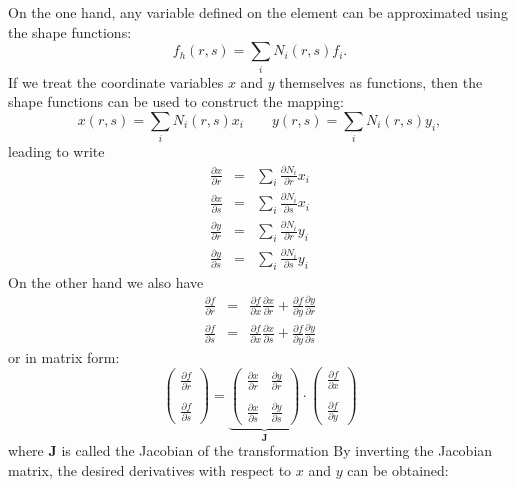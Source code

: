 On the one hand, any variable defined on the element can be approximated using the shape functions:
\begin{equation}
f_h(r,s)=\sum_i N_i(r,s) f_i.
\end{equation}
If we treat the coordinate variables $x$ and $y$ themselves as functions, 
then the shape functions can be used to construct the mapping:
\begin{equation}
x(r,s)=\sum_i N_i(r,s) x_i 
\qquad
y(r,s)=\sum_i N_i(r,s) y_i,  \label{eqxy}
\end{equation}
leading to write
\begin{eqnarray}
\frac{\partial x}{\partial r} &=& \sum_i \frac{\partial N_i}{\partial r} x_i \\
\frac{\partial x}{\partial s} &=& \sum_i \frac{\partial N_i}{\partial s} x_i \\
\frac{\partial y}{\partial r} &=& \sum_i \frac{\partial N_i}{\partial r} y_i \\
\frac{\partial y}{\partial s} &=& \sum_i \frac{\partial N_i}{\partial s} y_i 
\end{eqnarray}
On the other hand we also have 
\begin{eqnarray}
\frac{\partial f}{\partial r} &=&
\frac{\partial f}{\partial x}\frac{\partial x}{\partial r}
+\frac{\partial f}{\partial y}\frac{\partial y}{\partial r} \\
\frac{\partial f}{\partial s} &=&
\frac{\partial f}{\partial x}\frac{\partial x}{\partial s}
+\frac{\partial f}{\partial y}\frac{\partial y}{\partial s}
\end{eqnarray}
or in matrix form:
\begin{equation}
\left(
\begin{array}{c}
\frac{\partial f}{\partial r} \\ \\
\frac{\partial f}{\partial s}
\end{array}
\right)
=
\underbrace{
\left(
\begin{array}{cc}
\frac{\partial x}{\partial r} & \frac{\partial y}{\partial r} \nonumber\\ \\
\frac{\partial x}{\partial s} & \frac{\partial y}{\partial s} \nonumber
\end{array}
\right)
}_{\bm J}
\cdot
\left(
\begin{array}{c}
\frac{\partial f}{\partial x} \\ \\
\frac{\partial f}{\partial y}
\end{array}
\right)
\end{equation}
where ${\bm J}$ is called the Jacobian of the transformation
By inverting the Jacobian matrix, the desired derivatives with respect to $x$
and $y$ can be obtained:

